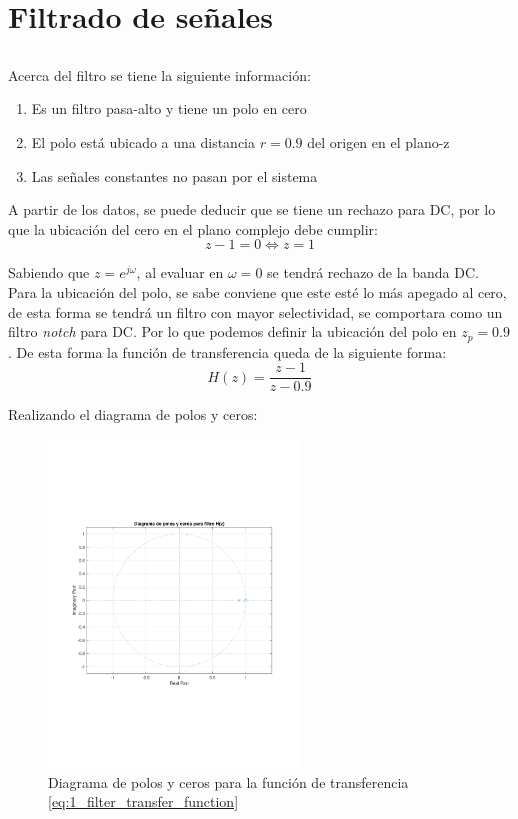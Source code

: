\section{Filtrado de señales}
	\subsection{}
		Acerca del filtro se tiene la siguiente información:
		\begin{enumerate}
			\item Es un filtro pasa-alto y tiene un polo en cero
			\item El polo está ubicado a una distancia $r = 0.9$ del origen en el plano-z
			\item Las señales constantes no pasan por el sistema
		\end{enumerate}
		
		A partir de los datos, se puede deducir que se tiene un rechazo para DC, por lo que la ubicación del cero en el plano complejo debe cumplir:
		\begin{equation*}
			z - 1 = 0 \Longleftrightarrow z = 1
		\end{equation*}
		
		Sabiendo que $z = e^{j\omega}$, al evaluar en $\omega = 0$ se tendrá rechazo de la banda DC. Para la ubicación del polo, se sabe conviene que este esté lo más apegado al cero, de esta forma se tendrá un filtro con mayor selectividad, se comportara como un filtro \textit{notch} 	para DC. Por lo que podemos definir la ubicación del polo en $z_{p} = 0.9$. De esta forma la función de transferencia queda de la siguiente forma:
		\begin{equation}
		H(z) = \frac{z-1}{z-0.9}
		\label{eq:1_filter_transfer_function}
		\end{equation}
		
		Realizando el diagrama de polos y ceros:
		\begin{figure}[H]
			\center
			\includegraphics[width=0.6\textwidth,clip, trim = {1.9cm 6.8cm 2.3cm 7cm}]{../plots/1_zp_diag.pdf}
			\caption{Diagrama de polos y ceros para la función de transferencia \ref{eq:1_filter_transfer_function}}
			\label{fig:1_zero_pole_diagram}
		\end{figure}
		
